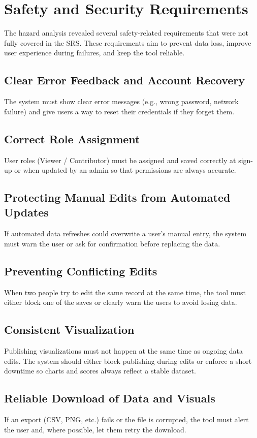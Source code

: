 \documentclass{article}
\begin{document}
\section{Safety and Security Requirements}
The hazard analysis revealed several safety-related requirements that were not fully covered in the SRS.
These requirements aim to prevent data loss, improve user experience during failures, and keep the tool reliable.

\subsection*{Clear Error Feedback and Account Recovery}
The system must show clear error messages (e.g., wrong password, network failure) and give users a way to reset their credentials if they forget them.

\subsection*{Correct Role Assignment}
User roles (Viewer / Contributor) must be assigned and saved correctly at sign-up or when updated by an admin so that permissions are always accurate.

\subsection*{Protecting Manual Edits from Automated Updates}
If automated data refreshes could overwrite a user’s manual entry, the system must warn the user or ask for confirmation before replacing the data.

\subsection*{Preventing Conflicting Edits}
When two people try to edit the same record at the same time, the tool must either block one of the saves or clearly warn the users to avoid losing data.

\subsection*{Consistent Visualization}
Publishing visualizations must not happen at the same time as ongoing data edits.
The system should either block publishing during edits or enforce a short downtime so charts and scores always reflect a stable dataset.

\subsection*{Reliable Download of Data and Visuals}
If an export (CSV, PNG, etc.) fails or the file is corrupted, the tool must alert the user and, where possible, let them retry the download.
\end{document}

